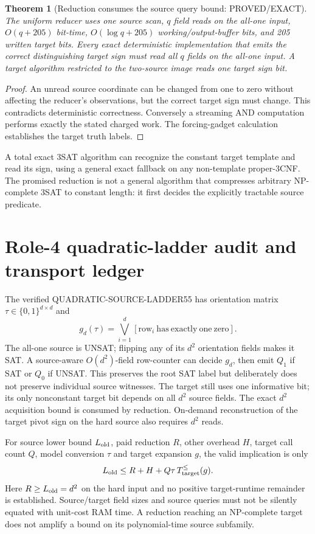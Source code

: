 \documentclass[11pt]{article}
\newtheorem{theorem}{Theorem}
\begin{document}
\begin{theorem}[Reduction consumes the source query bound: PROVED/EXACT]
The uniform reducer uses one source scan, \(q\) field reads on the all-one input, \(O(q+205)\) bit-time, \(O(\log q+205)\) working/output-buffer bits, and 205 written target bits. Every exact deterministic implementation that emits the correct distinguishing target sign must read all \(q\) fields on the all-one input. A target algorithm restricted to the two-source image reads one target sign bit.
\end{theorem}
\begin{proof}
An unread source coordinate can be changed from one to zero without affecting the reducer's observations, but the correct target sign must change. This contradicts deterministic correctness. Conversely a streaming AND computation performs exactly the stated charged work. The forcing-gadget calculation establishes the target truth labels.
\end{proof}
A total exact 3SAT algorithm can recognize the constant target template and read its sign, using a general exact fallback on any non-template proper-3CNF. The promised reduction is not a general algorithm that compresses arbitrary NP-complete 3SAT to constant length: it first decides the explicitly tractable source predicate.

\section{Role-4 quadratic-ladder audit and transport ledger}
The verified QUADRATIC-SOURCE-LADDER55 has orientation matrix \(\tau\in\{0,1\}^{d\times d}\) and
\[
g_d(\tau)=\bigvee_{i=1}^d[\mathrm{row}_i\mathrm{\ has\ exactly\ one\ zero}].
\]
The all-one source is UNSAT; flipping any of its \(d^2\) orientation fields makes it SAT. A source-aware \(O(d^2)\)-field row-counter can decide \(g_d\), then emit \(Q_1\) if SAT or \(Q_0\) if UNSAT. This preserves the root SAT label but deliberately does not preserve individual source witnesses. The target still uses one informative bit; its only nonconstant target bit depends on all \(d^2\) source fields. The exact \(d^2\) acquisition bound is consumed by reduction. On-demand reconstruction of the target pivot sign on the hard source also requires \(d^2\) reads.

For source lower bound \(L_{\rm old}\), paid reduction \(R\), other overhead \(H\), target call count \(Q\), model conversion \(\tau\) and target expansion \(g\), the valid implication is only
\[
L_{\rm old}\le R+H+Q\tau\,T_{\rm target}^{\le}(g).
\]
Here \(R\ge L_{\rm old}=d^2\) on the hard input and no positive target-runtime remainder is established. Source/target field sizes and source queries must not be silently equated with unit-cost RAM time. A reduction reaching an NP-complete target does not amplify a bound on its polynomial-time source subfamily.
\end{document}
